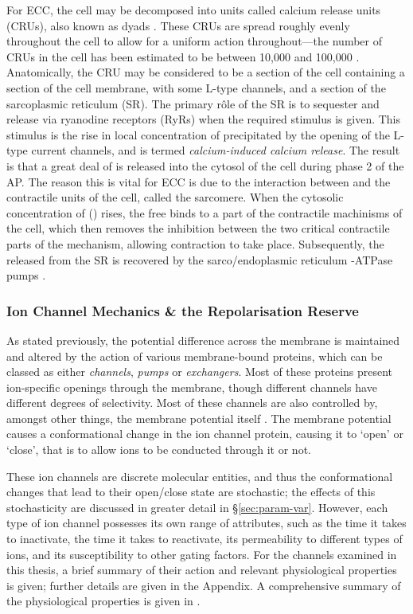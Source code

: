 \documentclass[../thesis-main.tex]{subfiles}
\begin{document}
 For ECC, the cell may be decomposed into units called calcium release units (CRUs), also known as dyads \citep{Cleemann1998}. These CRUs are spread roughly evenly throughout the cell to allow for a uniform action throughout---the number of CRUs in the cell has been estimated to be between 10,000 and 100,000 \citep{Cleemann1998,Greenstein2002}. Anatomically, the CRU may be considered to be a section of the cell containing a section of the cell membrane, with some L-type \ca{} channels, and a section of the sarcoplasmic reticulum (SR). The primary r\^ole of the SR is to sequester and release \ca{} via ryanodine receptors (RyRs) when the required stimulus is given. This stimulus is the rise in local concentration of \ca{} precipitated by the opening of the L-type \ca{} current channels, and is termed \emph{calcium-induced calcium release}. The result is that a great deal of \ca{} is released into the cytosol of the cell during phase 2 of the AP. The reason this is vital for ECC is due to the interaction between \ca{} and the contractile units of the cell, called the sarcomere. When the cytosolic concentration of \ca{} (\cai{}) rises, the free \ca{} binds to a part of the contractile machinisms of the cell, which then removes the inhibition between the two critical contractile parts of the mechanism, allowing contraction to take place. Subsequently, the \ca{} released from the SR is recovered by the sarco/endoplasmic reticulum \ca{}-ATPase pumps \citep{Franzini-Armstrong2005}.
 
 \subsubsection{Ion Channel Mechanics \& the Repolarisation Reserve}
 \label{subsubsec:channel-mechanics}
 As stated previously, the potential difference across the membrane is maintained and altered by the action of various membrane-bound proteins, which can be classed as either \emph{channels}, \emph{pumps} or \emph{exchangers}. Most of these proteins present ion-specific openings through the membrane, though different channels have different degrees of selectivity. Most of these channels are also controlled by, amongst other things, the membrane potential itself \citep{Bezanilla2000}. The membrane potential causes a conformational change in the ion channel protein, causing it to `open' or `close', that is to allow ions to be conducted through it or not.
 
 These ion channels are discrete molecular entities, and thus the conformational changes that lead to their open/close state are stochastic; the effects of this stochasticity are discussed in greater detail in \S\ref{sec:param-var}. However, each type of ion channel possesses its own range of attributes, such as the time it takes to inactivate, the time it takes to reactivate, its permeability to different types of ions, and its susceptibility to other gating factors. For the channels examined in this thesis, a brief summary of their action and relevant physiological properties is given; further details are given in the Appendix. A comprehensive summary of the physiological properties is given in \citet{Carmeliet2002}.
 
\end{document}
